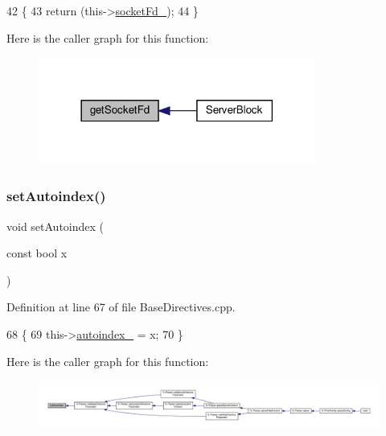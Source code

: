 \begin{DoxyCode}
42     \{
43         \textcolor{keywordflow}{return} (this->\hyperlink{classft_1_1_server_block_ab9901cea4f6daccf6b8f8a3c6f438e9c}{socketFd\_});
44     \}
\end{DoxyCode}
Here is the caller graph for this function\+:
\nopagebreak
\begin{figure}[H]
\begin{center}
\leavevmode
\includegraphics[width=258pt]{classft_1_1_server_block_ac1e0cef7ed1f4b52957f006c3fa71b03_icgraph}
\end{center}
\end{figure}
\mbox{\label{classft_1_1_base_directives_ae7293c7bbf34e9bdc60c540dccd53342}} 
\subsubsection{\texorpdfstring{set\+Autoindex()}{setAutoindex()}}
{\footnotesize\ttfamily void set\+Autoindex (\begin{DoxyParamCaption}\item[{const bool}]{x }\end{DoxyParamCaption})\hspace{0.3cm}{\ttfamily [inherited]}}



Definition at line 67 of file Base\+Directives.\+cpp.


\begin{DoxyCode}
68     \{
69         this->\hyperlink{classft_1_1_base_directives_a4ebffbe32f50a462afa139c6f03c1a4f}{autoindex\_} = x;
70     \}
\end{DoxyCode}
Here is the caller graph for this function\+:
\nopagebreak
\begin{figure}[H]
\begin{center}
\leavevmode
\includegraphics[width=350pt]{classft_1_1_base_directives_ae7293c7bbf34e9bdc60c540dccd53342_icgraph}
\end{center}
\end{figure}
\mbox{\label{classft_1_1_base_directives_a39bf4922f3236043c76beaffaa557a3b}} 
